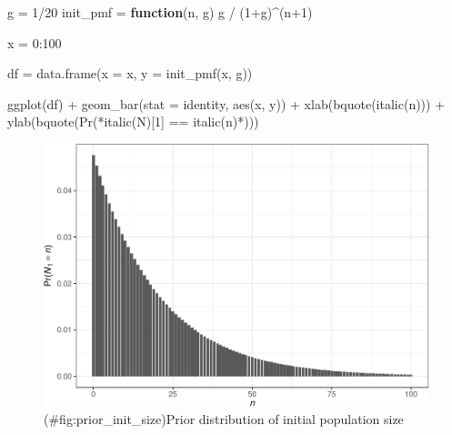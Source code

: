 \documentclass[
]{book}
\newenvironment{Shaded}{\begin{snugshade}}{\end{snugshade}}
\newcommand{\AttributeTok}[1]{\textcolor[rgb]{0.77,0.63,0.00}{#1}}
\newcommand{\ControlFlowTok}[1]{\textcolor[rgb]{0.13,0.29,0.53}{\textbf{#1}}}
\newcommand{\DecValTok}[1]{\textcolor[rgb]{0.00,0.00,0.81}{#1}}
\newcommand{\FunctionTok}[1]{\textcolor[rgb]{0.00,0.00,0.00}{#1}}
\newcommand{\NormalTok}[1]{#1}
\newcommand{\OtherTok}[1]{\textcolor[rgb]{0.56,0.35,0.01}{#1}}
\newcommand{\SpecialCharTok}[1]{\textcolor[rgb]{0.00,0.00,0.00}{#1}}
\newcommand{\StringTok}[1]{\textcolor[rgb]{0.31,0.60,0.02}{#1}}
\begin{document}
\begin{Shaded}
\begin{Highlighting}[]
\NormalTok{g }\OtherTok{=} \DecValTok{1}\SpecialCharTok{/}\DecValTok{20}
\NormalTok{init\_pmf }\OtherTok{=} \ControlFlowTok{function}\NormalTok{(n, g) g }\SpecialCharTok{/}\NormalTok{ (}\DecValTok{1}\SpecialCharTok{+}\NormalTok{g)}\SpecialCharTok{\^{}}\NormalTok{(n}\SpecialCharTok{+}\DecValTok{1}\NormalTok{)}

\NormalTok{x }\OtherTok{=} \DecValTok{0}\SpecialCharTok{:}\DecValTok{100}

\NormalTok{df }\OtherTok{=} \FunctionTok{data.frame}\NormalTok{(}\AttributeTok{x =}\NormalTok{ x, }\AttributeTok{y =} \FunctionTok{init\_pmf}\NormalTok{(x, g))}

\FunctionTok{ggplot}\NormalTok{(df) }\SpecialCharTok{+}
  \FunctionTok{geom\_bar}\NormalTok{(}\AttributeTok{stat =} \StringTok{\textquotesingle{}identity\textquotesingle{}}\NormalTok{, }\FunctionTok{aes}\NormalTok{(x, y)) }\SpecialCharTok{+}
  \FunctionTok{xlab}\NormalTok{(}\FunctionTok{bquote}\NormalTok{(}\FunctionTok{italic}\NormalTok{(n))) }\SpecialCharTok{+}
  \FunctionTok{ylab}\NormalTok{(}\FunctionTok{bquote}\NormalTok{(}\StringTok{\textquotesingle{}Pr(\textquotesingle{}}\SpecialCharTok{*}\FunctionTok{italic}\NormalTok{(N)[}\DecValTok{1}\NormalTok{] }\SpecialCharTok{==} \FunctionTok{italic}\NormalTok{(n)}\SpecialCharTok{*}\StringTok{\textquotesingle{})\textquotesingle{}}\NormalTok{))}
\end{Highlighting}
\end{Shaded}

\begin{figure}
\centering
\includegraphics{_main_files/figure-latex/prior_init_size-1.pdf}
\caption{(\#fig:prior\_init\_size)Prior distribution of initial population size}
\end{figure}
\end{document}
